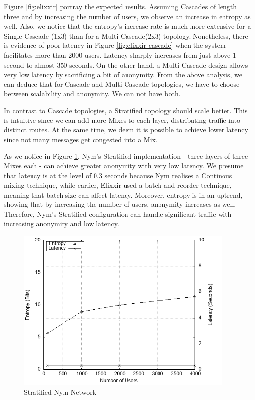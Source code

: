 \documentclass[logo,msc,cyber]{infthesis}   %
\begin{document}
 Figure \ref{fig:elixxir} portray the expected results. Assuming
 Cascades of length three and by increasing the number of users, we observe an
 increase in entropy as well. Also, we notice that the entropy's increase rate
 is much more extensive for a Single-Cascade (1x3) than for a Multi-Cascade(2x3)
 topology. Nonetheless, there is evidence of poor latency in Figure
 \ref{fig:elixxir-cascade} when the system facilitates more than 2000 users.
 Latency sharply increases from just above 1 second to almost 350 seconds. On
 the other hand, a Multi-Cascade design allows very low latency by sacrificing a
 bit of anonymity. From the above analysis, we can deduce that for Cascade and
 Multi-Cascade topologies, we have to choose between scalability and anonymity.
 We can not have both.

 In contrast to Cascade topologies, a Stratified topology should scale better.
 This is intuitive since we can add more Mixes to each layer, distributing
 traffic into distinct routes. At the same time, we deem it is possible to
 achieve lower latency since not many messages get congested into a Mix. 

 As we notice in Figure \ref{fig:nym-stratified}, Nym's Stratified
 implementation - three layers of three Mixes each - can achieve greater anonymity with
 very low latency. We presume that latency is at the level of 0.3 seconds
 because Nym realises a Continous mixing technique, while earlier, Elixxir used
 a batch and reorder technique, meaning that batch size can affect latency.
 Moreover, entropy is in an uptrend, showing that by increasing the number of
 users, anonymity increases as well. Therefore, Nym's Stratified configuration
 can handle significant traffic with increasing anonymity and low latency.

\begin{figure}[h!]
    \centering
    \includegraphics[height=8cm]{figures/simulator/2.png}
    \caption{Stratified Nym Network}
    \label{fig:nym-stratified}
 \end{figure}
\end{document}
